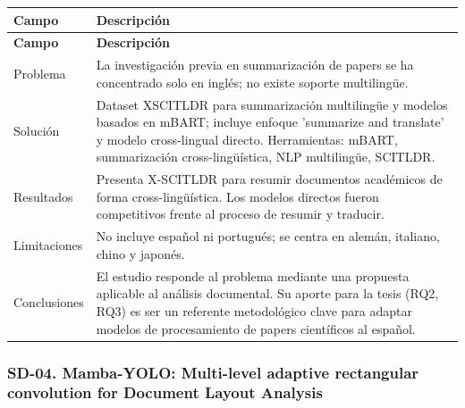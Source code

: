 \begin{longtable}{@{}>{\raggedright\arraybackslash}p{}>{\raggedright\arraybackslash}p{}@{}}
\toprule
\textbf{Campo} & \textbf{Descripción} \\
\midrule
\endfirsthead
\toprule
\textbf{Campo} & \textbf{Descripción} \\
\midrule
\endhead
\bottomrule
\endfoot
\endlastfoot
Problema & La investigación previa en summarización de papers se ha concentrado solo en inglés; no existe soporte multilingüe. \\
Solución & Dataset XSCITLDR para summarización multilingüe y modelos basados en mBART; incluye enfoque 'summarize and translate' y modelo cross-lingual directo. Herramientas: mBART, summarización cross-lingüística, NLP multilingüe, SCITLDR. \\
Resultados & Presenta X-SCITLDR para resumir documentos académicos de forma cross-lingüística. Los modelos directos fueron competitivos frente al proceso de resumir y traducir. \\
Limitaciones & No incluye español ni portugués; se centra en alemán, italiano, chino y japonés. \\
Conclusiones & El estudio responde al problema mediante una propuesta aplicable al análisis documental. Su aporte para la tesis (RQ2, RQ3) es ser un referente metodológico clave para adaptar modelos de procesamiento de papers científicos al español. \\
\end{longtable}

\subsubsection*{SD-04. Mamba-YOLO: Multi-level adaptive rectangular convolution for Document Layout Analysis}

